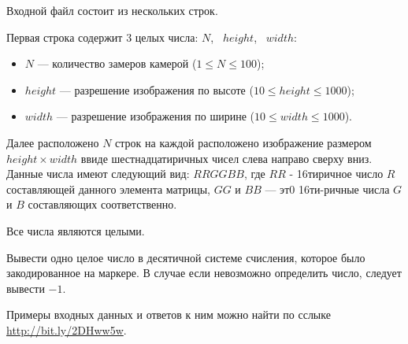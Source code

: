 Входной файл состоит из нескольких строк.

Первая строка содержит 3 целых числа: $N$,~ $height$,~ $width$:
\begin{itemize}
    \item $N$ --- количество замеров камерой ($1 \leq N \leq 100$);
    \item $height$ --- разрешение изображения по высоте ($10 \leq height \leq 1000$);
    \item $width$ --- разрешение изображения по ширине ($10 \leq width \leq 1000$).
\end{itemize}

Далее расположено $N$ строк на каждой расположено изображение размером
$height\times width$ ввиде шестнадцатиричных чисел слева направо сверху вниз.
Данные числа имеют следующий вид: $RRGGBB$, где $RR$ - 16тиричное число $R$ составляющей данного элемента
матрицы, $GG$ и $BB$ --- эт0 16ти-ричные числа $G$ и $B$ составляющих соответственно.

Все числа являются целыми.

\outputfmtSection
Вывести одно целое число в десятичной системе счисления, которое было закодированное на маркере.
В случае если невозможно определить число, следует вывести $-1$.


\exampleSection


Примеры входных данных и ответов к ним можно найти по сслыке \url{http://bit.ly/2DHww5w}.




